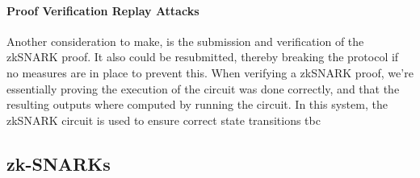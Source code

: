 \documentclass[../../thesis.tex]{subfiles}
\begin{document}
\paragraph{Proof Verification Replay Attacks}
Another consideration to make, is the submission and verification of the zkSNARK proof. It also could be resubmitted, thereby breaking the protocol if no measures are in place to prevent this. When verifying a zkSNARK proof, we're essentially proving the execution of the circuit was done correctly, and that the resulting outputs where computed by running the circuit. In this system, the zkSNARK circuit is used to ensure correct state transitions tbc


\subsection{zk-SNARKs}



\end{document}
